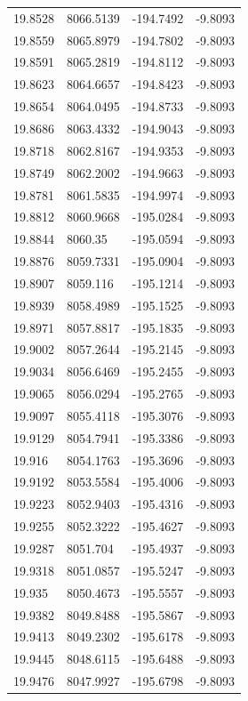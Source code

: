\begin{table}[H]
\begin{tabular}{llll}
19.8528 & 8066.5139 & -194.7492 & -9.8093 \\
19.8559 & 8065.8979 & -194.7802 & -9.8093 \\
19.8591 & 8065.2819 & -194.8112 & -9.8093 \\
19.8623 & 8064.6657 & -194.8423 & -9.8093 \\
19.8654 & 8064.0495 & -194.8733 & -9.8093 \\
19.8686 & 8063.4332 & -194.9043 & -9.8093 \\
19.8718 & 8062.8167 & -194.9353 & -9.8093 \\
19.8749 & 8062.2002 & -194.9663 & -9.8093 \\
19.8781 & 8061.5835 & -194.9974 & -9.8093 \\
19.8812 & 8060.9668 & -195.0284 & -9.8093 \\
19.8844 & 8060.35 & -195.0594 & -9.8093 \\
19.8876 & 8059.7331 & -195.0904 & -9.8093 \\
19.8907 & 8059.116 & -195.1214 & -9.8093 \\
19.8939 & 8058.4989 & -195.1525 & -9.8093 \\
19.8971 & 8057.8817 & -195.1835 & -9.8093 \\
19.9002 & 8057.2644 & -195.2145 & -9.8093 \\
19.9034 & 8056.6469 & -195.2455 & -9.8093 \\
19.9065 & 8056.0294 & -195.2765 & -9.8093 \\
19.9097 & 8055.4118 & -195.3076 & -9.8093 \\
19.9129 & 8054.7941 & -195.3386 & -9.8093 \\
19.916 & 8054.1763 & -195.3696 & -9.8093 \\
19.9192 & 8053.5584 & -195.4006 & -9.8093 \\
19.9223 & 8052.9403 & -195.4316 & -9.8093 \\
19.9255 & 8052.3222 & -195.4627 & -9.8093 \\
19.9287 & 8051.704 & -195.4937 & -9.8093 \\
19.9318 & 8051.0857 & -195.5247 & -9.8093 \\
19.935 & 8050.4673 & -195.5557 & -9.8093 \\
19.9382 & 8049.8488 & -195.5867 & -9.8093 \\
19.9413 & 8049.2302 & -195.6178 & -9.8093 \\
19.9445 & 8048.6115 & -195.6488 & -9.8093 \\
19.9476 & 8047.9927 & -195.6798 & -9.8093 \\

\end{tabular}
\end{table}
